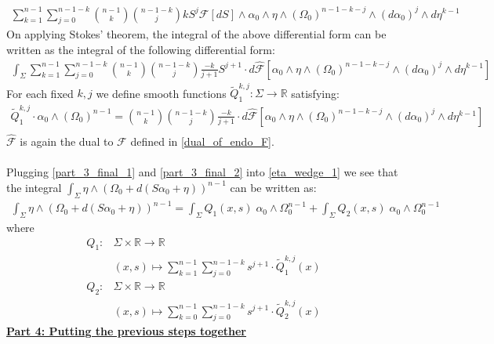 \documentclass[11pt]{amsart}
\theoremstyle{plain}
\theoremstyle{definition}
\theoremstyle{remark}
\begin{document}
\begin{align}
\sum_{k=1}^{n-1} \sum_{j=0}^{n-1-k} \binom{n-1}{k}   \binom{n-1-k}{j} k S^j \mathcal{F}[dS] \wedge \alpha_0 \wedge \eta \wedge (\Omega_0)^{n-1-k-j} \wedge (d\alpha_0)^{j} \wedge d\eta^{k-1}
\end{align}
On applying Stokes' theorem, the integral of the above differential form can be written as the integral of the following differential form:
\begin{align}\label{part_3_step_2_eq_2}
   \int_{\Sigma} \sum_{k=1}^{n-1} \sum_{j=0}^{n-1-k} \binom{n-1}{k}  \binom{n-1-k}{j} \frac{-k}{j+1} S^{j+1} \cdot d\hat{\mathcal{F}}[\alpha_0 \wedge \eta \wedge (\Omega_0)^{n-1-k-j} \wedge (d\alpha_0)^{j} \wedge d\eta^{k-1}]
\end{align}
For each fixed $k,j$ we define smooth functions $\tilde{Q}^{k,j}_1: \Sigma \rightarrow \mathbb{R}$ satisfying:
\begin{align}\label{part_3_final_2}
 \tilde{Q}^{k,j}_1 \cdot \alpha_0 \wedge (\Omega_0)^{n-1} = \binom{n-1}{k}  \binom{n-1-k}{j} \frac{-k}{j+1} \cdot d\hat{\mathcal{F}}[\alpha_0 \wedge \eta \wedge (\Omega_0)^{n-1-k-j} \wedge (d\alpha_0)^{j} \wedge d\eta^{k-1}] \\\nonumber  
\end{align}
$\hat{\mathcal{F}}$ is again the dual to $\mathcal{F}$ defined in \eqref{dual_of_endo_F}.\\
\\
Plugging \eqref{part_3_final_1} and \eqref{part_3_final_2} into \eqref{eta_wedge_1} we see that the integral $\int_{\Sigma} \eta \wedge (\Omega_0 + d(S\alpha_0+\eta))^{n-1}$ can be written as:
\begin{align}\label{part_3_final_final}
   \int_{\Sigma}\eta \wedge (\Omega_0 + d(S\alpha_0+\eta))^{n-1} = \int_{\Sigma} Q_1(x,s) \; \alpha_0 \wedge \Omega_0^{n-1} + \int_{\Sigma} Q_2(x,s) \; \alpha_0 \wedge \Omega_0^{n-1} 
 \end{align}  
 where 
\begin{align}\label{def_of_Q_1_and_Q_2}
 Q_1: &\Sigma \times \mathbb{R} \rightarrow \mathbb{R} \\\nonumber 
 &(x,s) \mapsto \sum_{k=1}^{n-1} \sum_{j=0}^{n-1-k} s^{j+1} \cdot \tilde{Q}^{k,j}_1(x) \\\nonumber 
 Q_2: &\Sigma \times \mathbb{R} \rightarrow \mathbb{R} \\\nonumber 
 &(x,s) \mapsto \sum_{k=0}^{n-1}   \sum^{n-1-k}_{j=0} s^{j+1} \cdot \tilde{Q}^{k,j}_2(x) 
\end{align}
\textbf{\underline{Part 4: Putting the previous steps together}}\\
\end{document}
